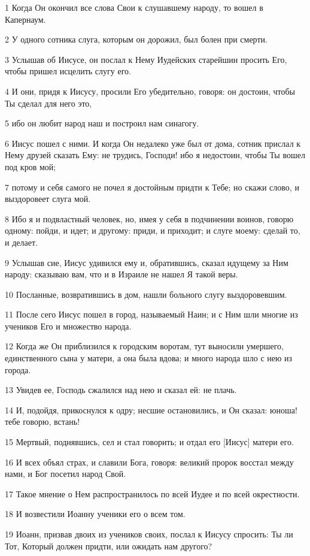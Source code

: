 \par 1 Когда Он окончил все слова Свои к слушавшему народу, то вошел в Капернаум.
\par 2 У одного сотника слуга, которым он дорожил, был болен при смерти.
\par 3 Услышав об Иисусе, он послал к Нему Иудейских старейшин просить Его, чтобы пришел исцелить слугу его.
\par 4 И они, придя к Иисусу, просили Его убедительно, говоря: он достоин, чтобы Ты сделал для него это,
\par 5 ибо он любит народ наш и построил нам синагогу.
\par 6 Иисус пошел с ними. И когда Он недалеко уже был от дома, сотник прислал к Нему друзей сказать Ему: не трудись, Господи! ибо я недостоин, чтобы Ты вошел под кров мой;
\par 7 потому и себя самого не почел я достойным придти к Тебе; но скажи слово, и выздоровеет слуга мой.
\par 8 Ибо я и подвластный человек, но, имея у себя в подчинении воинов, говорю одному: пойди, и идет; и другому: приди, и приходит; и слуге моему: сделай то, и делает.
\par 9 Услышав сие, Иисус удивился ему и, обратившись, сказал идущему за Ним народу: сказываю вам, что и в Израиле не нашел Я такой веры.
\par 10 Посланные, возвратившись в дом, нашли больного слугу выздоровевшим.
\par 11 После сего Иисус пошел в город, называемый Наин; и с Ним шли многие из учеников Его и множество народа.
\par 12 Когда же Он приблизился к городским воротам, тут выносили умершего, единственного сына у матери, а она была вдова; и много народа шло с нею из города.
\par 13 Увидев ее, Господь сжалился над нею и сказал ей: не плачь.
\par 14 И, подойдя, прикоснулся к одру; несшие остановились, и Он сказал: юноша! тебе говорю, встань!
\par 15 Мертвый, поднявшись, сел и стал говорить; и отдал его [Иисус] матери его.
\par 16 И всех объял страх, и славили Бога, говоря: великий пророк восстал между нами, и Бог посетил народ Свой.
\par 17 Такое мнение о Нем распространилось по всей Иудее и по всей окрестности.
\par 18 И возвестили Иоанну ученики его о всем том.
\par 19 Иоанн, призвав двоих из учеников своих, послал к Иисусу спросить: Ты ли Тот, Который должен придти, или ожидать нам другого?
